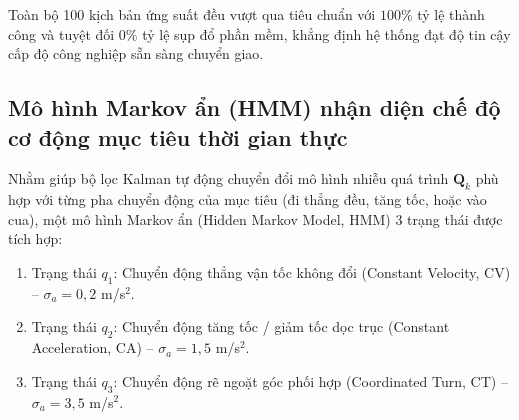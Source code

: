 \begin{table}[H]
\centering
\caption{Tổng kết kết quả kiểm thử ứng suất ngẫu nhiên Monte Carlo trên 100 kịch bản độc lập}
\label{tab:monte-carlo-stress-test-summary}
\end{table}

Toàn bộ 100 kịch bản ứng suất đều vượt qua tiêu chuẩn với $100\%$ tỷ lệ thành công và tuyệt đối $0\%$ tỷ lệ sụp đổ phần mềm, khẳng định hệ thống đạt độ tin cậy cấp độ công nghiệp sẵn sàng chuyển giao.

\subsection{Mô hình Markov ẩn (HMM) nhận diện chế độ cơ động mục tiêu thời gian thực}

\hspace{0.5cm} Nhằm giúp bộ lọc Kalman tự động chuyển đổi mô hình nhiễu quá trình $\mathbf{Q}_k$ phù hợp với từng pha chuyển động của mục tiêu (đi thẳng đều, tăng tốc, hoặc vào cua), một mô hình Markov ẩn (Hidden Markov Model, HMM) 3 trạng thái được tích hợp:
\begin{enumerate}
    \item Trạng thái $q_1$: Chuyển động thẳng vận tốc không đổi (Constant Velocity, CV) -- $\sigma_a = 0{,}2$ m/s$^2$.
    \item Trạng thái $q_2$: Chuyển động tăng tốc / giảm tốc dọc trục (Constant Acceleration, CA) -- $\sigma_a = 1{,}5$ m/s$^2$.
    \item Trạng thái $q_3$: Chuyển động rẽ ngoặt góc phối hợp (Coordinated Turn, CT) -- $\sigma_a = 3{,}5$ m/s$^2$.
\end{enumerate}

